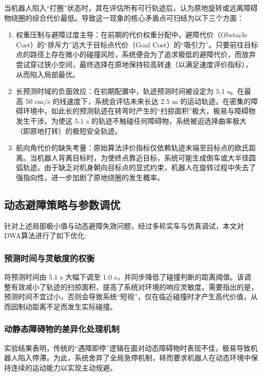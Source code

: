 当机器人陷入“打圈”状态时，其在评估所有可行轨迹后，认为原地旋转或远离障碍物绕圈的综合代价最低。导致这一现象的核心矛盾点可归结为以下三个方面：

\begin{enumerate}
    \item 权重压制与避障过度主导：在前期的代价权重分配中，避障代价（Obstacle Cost）的“排斥力”远大于目标点代价（Goal Cost）的“吸引力”。只要前往目标点的路径上存在微小的碰撞风险，系统便会为了追求极低的避障代价，而放弃尝试穿过狭小空间，最终选择在原地保持较高转速（以满足速度评价指标），从而陷入局部最优。
    
    \item 长预测时域的负面效应：在初期配置中，轨迹预测时间被设定为 $5.1\text{ s}$。在最高 $50\text{ cm/s}$ 的线速度下，系统会评估未来长达 $2.5\text{ m}$ 的运动轨迹。在密集的障碍环境中，如此长的预测轨迹在转弯时产生的“扫掠面积”极大，极易与障碍物发生干涉。为使这 $5.1\text{ s}$ 的轨迹不触碰任何障碍物，系统被迫选择曲率极大（即原地打转）的极短安全轨迹。
    
    \item 航向角代价的缺失考量：原始算法评价指标仅依赖轨迹末端至目标点的欧氏距离。当机器人背离目标时，为使终点靠近目标，系统可能生成倒车或大半径圆弧轨迹。由于缺乏对机身朝向目标点的显式约束，机器人在旋转过程中失去了强指向性，进一步加剧了原地绕圈的发生概率。
\end{enumerate}

\subsection{动态避障策略与参数调优}

针对上述局部极小值与动态避障失效问题，经过多轮实车与仿真调试，本文对DWA算法进行了如下优化:

\subsubsection{预测时间与灵敏度的权衡}
将预测时间由 $5.1\text{ s}$ 大幅下调至 $1.0\text{ s}$，并同步降低了碰撞判断的距离阈值。该调整有效减小了轨迹的扫掠面积，提高了系统对环境的响应灵敏度。需要指出的是，预测时间不宜过小，否则会导致系统“短视”，仅在临近碰撞时才产生高代价值，从而因制动距离不足而发生实际碰撞。

\subsubsection{动静态障碍物的差异化处理机制}
实验结果表明，传统的“遇障即停”逻辑在面对动态障碍物时表现不佳，极易导致机器人陷入停滞。为此，系统舍弃了全局急停机制，转而要求机器人在动态环境中保持连续的运动能力以实现主动规避。


